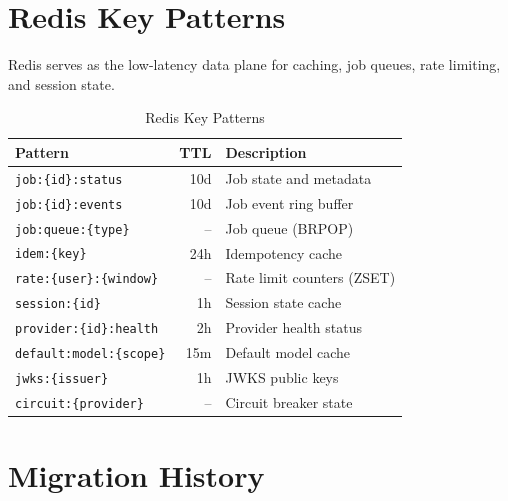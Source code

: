 \documentclass[a4paper,twoside]{sapthesis}
\begin{document}
\section{Redis Key Patterns}
\label{app:db:redis}

Redis serves as the low-latency data plane for caching, job queues, rate limiting, and session state.

\begin{table}[ht]
\centering
\caption{Redis Key Patterns}
\label{tab:redis-keys-appendix}
\small
\begin{tabularx}{\textwidth}{lrX}
    \hline
    \textbf{Pattern} & \textbf{TTL} & \textbf{Description} \\
    \hline
    \texttt{job:\{id\}:status} & 10d & Job state and metadata \\
    \texttt{job:\{id\}:events} & 10d & Job event ring buffer \\
    \texttt{job:queue:\{type\}} & -- & Job queue (BRPOP) \\
    \texttt{idem:\{key\}} & 24h & Idempotency cache \\
    \texttt{rate:\{user\}:\{window\}} & -- & Rate limit counters (ZSET) \\
    \texttt{session:\{id\}} & 1h & Session state cache \\
    \texttt{provider:\{id\}:health} & 2h & Provider health status \\
    \texttt{default:model:\{scope\}} & 15m & Default model cache \\
    \texttt{jwks:\{issuer\}} & 1h & JWKS public keys \\
    \texttt{circuit:\{provider\}} & -- & Circuit breaker state \\
    \hline
\end{tabularx}
\end{table}

\section{Migration History}
\label{app:db:migrations}
\end{document}
